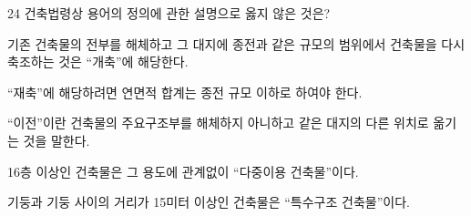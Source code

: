 \begin{question}{24}
건축법령상 용어의 정의에 관한 설명으로 옳지 않은 것은?
\begin{choices}
  \item 기존 건축물의 전부를 해체하고 그 대지에 종전과 같은 규모의 범위에서 건축물을 다시 축조하는 것은 “개축”에 해당한다.
  \item “재축”에 해당하려면 연면적 합계는 종전 규모 이하로 하여야 한다.
  \item “이전”이란 건축물의 주요구조부를 해체하지 아니하고 같은 대지의 다른 위치로 옮기는 것을 말한다.
  \item 16층 이상인 건축물은 그 용도에 관계없이 “다중이용 건축물”이다.
  \item 기둥과 기둥 사이의 거리가 15미터 이상인 건축물은 “특수구조 건축물”이다.
\end{choices}
\end{question}

